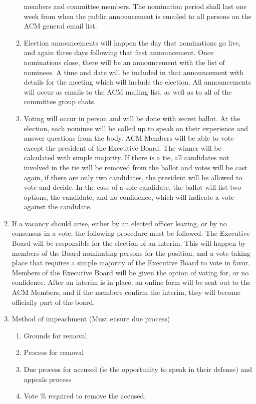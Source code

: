 \documentclass[11pt,a4paper,notitlepage]{article}
\begin{document}
\begin{enumerate}[label=\Alph*.]
\begin{enumerate}[label=\arabic*.]
      members and committee members. The nomination period shall last one week
      from when the public announcement is emailed to all persons on the ACM
      general email list.
      \item Election announcements will happen the day that nominations go live,
      and again three days following that first announcement. Once nominations
      close, there will be an announcement with the list of nominees. A time and
      date will be included in that announcement with details for the meeting
      which will include the election. All announcements will occur as emails to
      the ACM mailing list, as well as to all of the committee group chats.
      \item Voting will occur in person and will be done with secret ballot. At
      the election, each nominee will be called up to speak on their experience
      and answer questions from the body. ACM Members will be able to vote
      except the president of the Executive Board. The winner will be calculated
      with simple majority. If there is a tie, all candidates not involved in
      the tie will be removed from the ballot and votes will be cast again, if
      there are only two candidates, the president will be allowed to vote and
      decide. In the case of a sole candidate, the ballot will list two options,
      the candidate, and no confidence, which will indicate a vote against the candidate.
    \end{enumerate}
  \item If a vacancy should arise, either by an elected officer leaving, or by
  no consensus in a vote, the following procedure must be followed. The
  Executive Board will be responsible for the election of an interim. This will
  happen by members of the Board nominating persons for the position, and a vote
  taking place that requires a simple majority of the Executive Board to vote in
  favor. Members of the Executive Board will be given the option of voting for,
  or no confidence. After an interim is in place, an online form will be sent
  out to the ACM Members, and if the members confirm the interim, they will
  become officially part of the board.
  \item Method of impeachment (Must ensure due process)
    \begin{enumerate}[label=\arabic*.]
      \item Grounds for removal
      \item Process for removal
      \item Due process for accused (ie the opportunity to speak in their
      defense) and appeals process
      \item Vote \% required to remove the accused.
    \end{enumerate}
  \end{enumerate}
\end{document}
